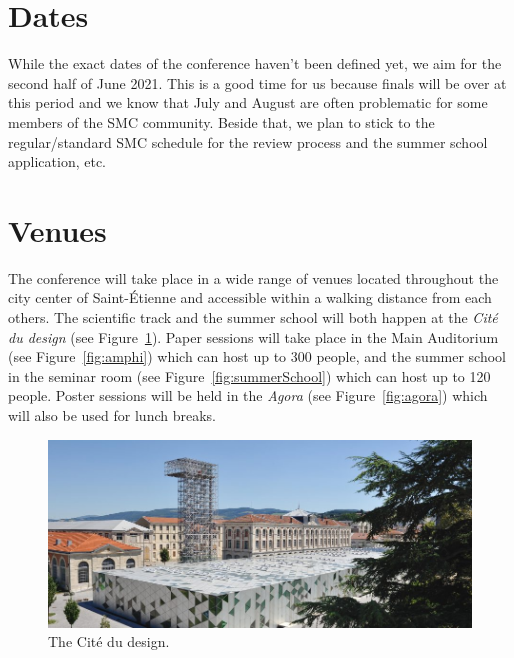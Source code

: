 \documentclass[fontsize=12pt]{scrartcl} %
\numberwithin{equation}{section} %
\numberwithin{figure}{section} %
\numberwithin{table}{section} %
\begin{document}
\section{Dates}

While the exact dates of the conference haven't been defined yet, we aim for the second half of June 2021. This is a good time for us because finals will be over at this period and we know that July and August are often problematic for some members of the SMC community. Beside that, we plan to stick to the regular/standard SMC schedule for the review process and the summer school application, etc.

\section{Venues}
\label{sec:venues}

The conference will take place in a wide range of venues located throughout the city center of Saint-Étienne and accessible within a walking distance from each others. The scientific track and the summer school will both happen at the \textit{Cité du design} (see Figure~\ref{fig:cite}). Paper sessions will take place in the Main Auditorium (see Figure~\ref{fig:amphi}) which can host up to 300 people, and the summer school in the seminar room (see Figure~\ref{fig:summerSchool}) which can host up to 120 people. Poster sessions will be held in the \textit{Agora} (see Figure~\ref{fig:agora}) which will also be used for lunch breaks.

\begin{figure}[htpb]
\begin{center}
\includegraphics[width=\columnwidth{}]{img/cite.jpg}
\caption{The Cité du design.}
\label{fig:cite}
\end{center}
\end{figure}
\end{document}
